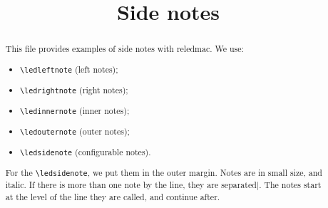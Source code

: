 \documentclass{article}
\begin{document}
\begin{english}
\date{}
\title{Side notes}
\maketitle
\begin{abstract}
This file provides examples of side notes with reledmac. 
We use:
\begin{itemize}
  \item \verb+\ledleftnote+ (left notes); 
  \item \verb+\ledrightnote+ (right notes); 
  \item \verb+\ledinnernote+ (inner notes); 
  \item \verb+\ledouternote+ (outer notes); 
  \item \verb+\ledsidenote+ (configurable notes).
\end{itemize}

For the \verb+\ledsidenote+, we put them in the outer margin.
Notes are in small size, and italic. If there is more than one note by the line, they are separated$ | $. The notes start at the level of the line they are called, and continue after.
\end{abstract}
\end{english}
\end{document}
